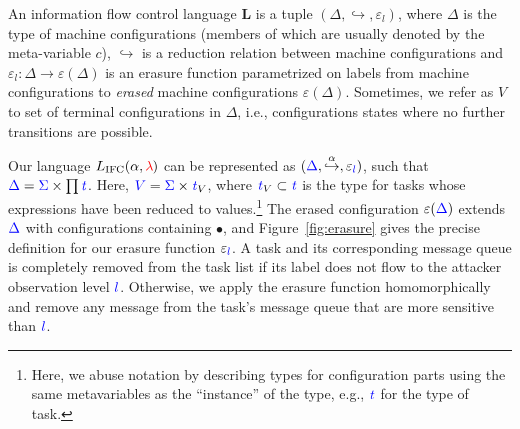 \documentclass{sigplanconf}
\newcommand{\Varid}[1]{\mathit{#1}}
\newcommand{\Red}[1]{{\color{red} #1}}
\begin{document}
\begin{definition}
    An information flow control language \ensuremath{\textbf{L}} is a tuple \ensuremath{(\Delta,\hookrightarrow,\varepsilon_{l})}, where $\ensuremath{\Delta}$ is the type of machine configurations (members
    of which are usually denoted by the meta-variable \ensuremath{c}), \ensuremath{\hookrightarrow} is a
    reduction relation between machine configurations and \ensuremath{\varepsilon_{l}\mathbin{:}\Delta\rightarrow\varepsilon(\Delta)}
    is an erasure function parametrized on labels from machine configurations to \emph{erased} machine
    configurations \ensuremath{\varepsilon(\Delta)}.  Sometimes, we refer as \ensuremath{V} to set of
     terminal configurations in \ensuremath{\Delta}, i.e., configurations states where
     no further transitions are possible.
\end{definition}

Our language \ensuremath{L_\text{IFC}(\alpha,\Red{\lambda}\;\!\!)} can be
represented as \ensuremath{(\ifc{\Delta},\overset{\alpha}{\hookrightarrow},\varepsilon_{\ifc{l}})}, such that
$\ensuremath{\ifc{\Delta}} = \ensuremath{\ifc{\Sigma}} \times \prod \ensuremath{\ifc{\Varid{t}}}$.  Here,
$\ensuremath{\ifc{V}} = \ensuremath{\ifc{\Sigma}} \times \ensuremath{\ifc{\Varid{t}}}_V$, where $\ensuremath{\ifc{\Varid{t}}}_V \subset \ensuremath{\ifc{\Varid{t}}}$ is the
type for tasks whose expressions have been reduced to
values.\footnote{
  Here, we abuse notation by describing types for configuration parts using the
  same metavariables as the ``instance'' of the type, e.g., \ensuremath{\ifc{\Varid{t}}} for the type of
  task.
}
The erased configuration \ensuremath{\varepsilon(\ifc{\Delta})} extends \ensuremath{\ifc{\Delta}} with configurations
containing \ensuremath{\bullet}, and Figure~\ref{fig:erasure} gives the precise definition for
our erasure function \ensuremath{\varepsilon_{\ifc{l}}}.
%
A task and its corresponding message queue is completely removed from the task
list if its label does not flow to the attacker observation level \ensuremath{\ifc{l}}.
Otherwise, we apply the erasure function homomorphically and remove any message
from the task's message queue that are more sensitive than \ensuremath{\ifc{l}}.
\end{document}
